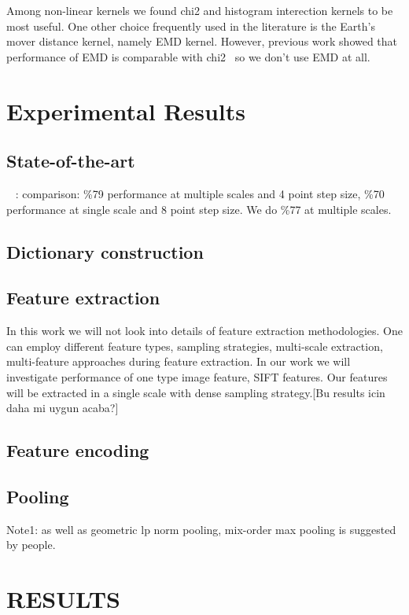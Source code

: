 \documentclass[conference]{IEEEtran}
\begin{document}
Among non-linear kernels we found chi2 and histogram interection kernels to be most useful. One other choice frequently used in the literature is the Earth's mover distance kernel, namely EMD kernel. However, previous work showed that performance of EMD is comparable with chi2~\cite{LocalFeaturesAndKernels} so we don't use EMD at all.

\section {Experimental Results}

\subsection {State-of-the-art}

~\cite{SecondOrderPooling} : comparison: \%79 performance at multiple scales and 4 point step size, \%70 performance at single scale and 8 point step size. We do \%77 at multiple scales.

\subsection {Dictionary construction}
\subsection {Feature extraction}
In this work we will not look into details of feature extraction methodologies. One can employ different feature types, sampling strategies, multi-scale extraction, multi-feature approaches during feature extraction. In our work we will investigate performance of one type image feature, SIFT features. Our features will be extracted in a single scale with dense sampling strategy.[Bu results icin daha mi uygun acaba?]
\subsection {Feature encoding}

\subsection {Pooling}

Note1: as well as geometric lp norm pooling, mix-order max pooling is suggested by people.

\clearpage

\section{RESULTS}
\end{document}
